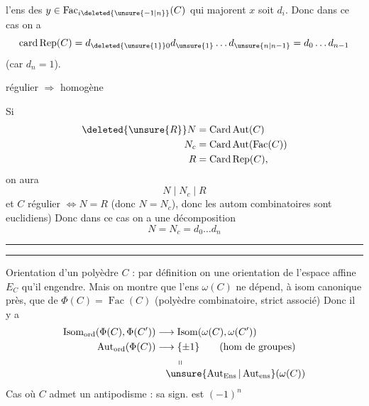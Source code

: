 l'ens des  $y\in\operatorname{Fac}_{i\deleted{\unsure{-1|n}}}(C)$ qui majorent $x$ soit $d_i$. Donc dans ce cas on a
\[
\operatorname{card}\operatorname{Rep}(C)=d_{\deleted{\unsure{1}}0}d_{\unsure{1}}\ldots d_{\unsure{n|n-1}}=d_0\ldots d_{n-1}
\]
(car $d_n=1$). 

 régulier $\Rightarrow$ homogène


Si
\[
\begin{aligned}
\deleted{\unsure{R}}N&=\operatorname{Card}\operatorname{Aut}(C)\\
N_c&=\operatorname{Card}\operatorname{Aut}(\operatorname{Fac}(C))\\
R&=\operatorname{Card}\operatorname{Rep}(C),
\end{aligned}
\]
on aura
\[
N\mid N_c\mid R
\]
et $C$ régulier $\Longleftrightarrow N=R$ (donc $N=N_c$), donc les autom combinatoires sont euclidiens) Donc dans ce cas on a une décomposition
\[
N=N_c=d_0\ldots d_n
\]

\noindent\rule{2em}{0.4pt}\par\nobreak\noindent\rule{2em}{0.4pt}

Orientation d'un polyèdre  $C$ : par définition on  une orientation de l'espace affine $E_C$ qu'il engendre.  Mais on montre que l'ens $\omega(C)$ ne dépend, à isom canonique près, que de $\Phi(C)=\operatorname{Fac}(C)$ (polyèdre combinatoire, strict associé) Donc il y a 
\[
\begin{aligned}
\operatorname{Isom}_{\mathrm{ord}}(\Phi(C),\Phi(C'))&\longrightarrow\operatorname{Isom}(\omega(C),\omega(C'))\\
\operatorname{Aut}_{\mathrm{ord}}(\Phi(C))&\longrightarrow\{\pm1\}\qquad\text{(hom de groupes)}\\
&\hspace{2em}\shortparallel\\[-3pt]
&\hspace{1em}\unsure{\operatorname{Aut}_{\mathrm{Ens}}|\operatorname{Aut}_{\mathrm{ens}}}(\omega(C))
\end{aligned}
\]
Cas où $C$ admet un antipodisme : sa sign. est $(-1)^n$
